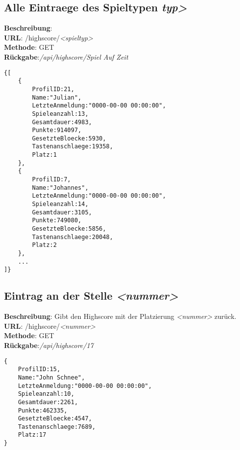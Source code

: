 \documentclass[11pt,a4paper]{article} %
\begin{document}
\subsection*{Alle Eintraege des Spieltypen \textit{typ>}}
\textbf{Beschreibung}: \\
\textbf{URL}: /highscore/\textit{<spieltyp>}\\
\textbf{Methode}: GET\\
\textbf{Rückgabe}:\textcolor{kommi}{\textit{/api/highscore/Spiel Auf Zeit}}\\
\begin{lstlisting}
{[
	{
		ProfilID:21,
		Name:"Julian",
		LetzteAnmeldung:"0000-00-00 00:00:00",
		Spieleanzahl:13,
		Gesamtdauer:4983,
		Punkte:914097,
		GesetzteBloecke:5930,
		Tastenanschlaege:19358,
		Platz:1
	},
	{
		ProfilID:7,
		Name:"Johannes",
		LetzteAnmeldung:"0000-00-00 00:00:00",
		Spieleanzahl:14,
		Gesamtdauer:3105,
		Punkte:749080,
		GesetzteBloecke:5856,
		Tastenanschlaege:20048,
		Platz:2
	},
	...
]}
\end{lstlisting}

\subsection*{Eintrag an der Stelle \textit{<nummer>}}
\textbf{Beschreibung}: Gibt den Highscore mit der Platzierung \textit{<nummer>} zurück.\\
\textbf{URL}: /highscore/\textit{<nummer>}\\
\textbf{Methode}: GET\\
\textbf{Rückgabe}:\textcolor{kommi}{\textit{/api/highscore/17}}\\
\begin{lstlisting}
{
	ProfilID:15,
	Name:"John Schnee",
	LetzteAnmeldung:"0000-00-00 00:00:00",
	Spieleanzahl:10,
	Gesamtdauer:2261,
	Punkte:462335,
	GesetzteBloecke:4547,
	Tastenanschlaege:7689,
	Platz:17
}
\end{lstlisting}

\end{document}
